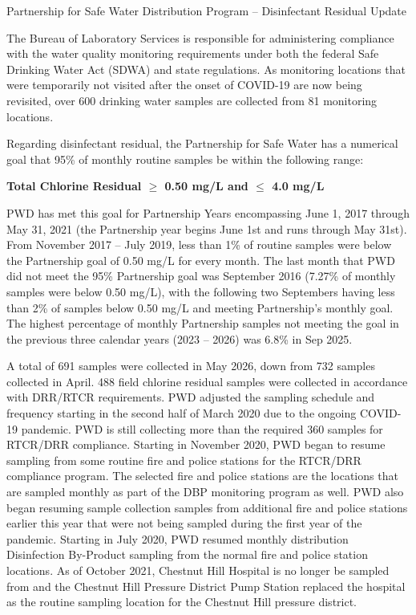 \documentclass[
]{article}
\author{}
\date{\vspace{-2.5em}}
\begin{document}
\renewcommand{\arraystretch}{2.5}

Partnership for Safe Water Distribution Program -- Disinfectant Residual
Update

The Bureau of Laboratory Services is responsible for administering
compliance with the water quality monitoring requirements under both the
federal Safe Drinking Water Act (SDWA) and state regulations. As
monitoring locations that were temporarily not visited after the onset
of COVID-19 are now being revisited, over 600 drinking water samples are
collected from 81 monitoring locations.

Regarding disinfectant residual, the Partnership for Safe Water has a
numerical goal that 95\% of monthly routine samples be within the
following range:

\textbf{Total Chlorine Residual \(\geq\) 0.50 mg/L and \(\leq\) 4.0
mg/L}

PWD has met this goal for Partnership Years encompassing June 1, 2017
through May 31, 2021 (the Partnership year begins June 1st and runs
through May 31st). From November 2017 -- July 2019, less than 1\% of
routine samples were below the Partnership goal of 0.50 mg/L for every
month. The last month that PWD did not meet the 95\% Partnership goal
was September 2016 (7.27\% of monthly samples were below 0.50 mg/L),
with the following two Septembers having less than 2\% of samples below
0.50 mg/L and meeting Partnership's monthly goal. The highest percentage
of monthly Partnership samples not meeting the goal in the previous
three calendar years (2023 -- 2026) was 6.8\% in Sep 2025.

A total of 691 samples were collected in May 2026, down from 732 samples
collected in April. 488 field chlorine residual samples were collected
in accordance with DRR/RTCR requirements. PWD adjusted the sampling
schedule and frequency starting in the second half of March 2020 due to
the ongoing COVID-19 pandemic. PWD is still collecting more than the
required 360 samples for RTCR/DRR compliance. Starting in November 2020,
PWD began to resume sampling from some routine fire and police stations
for the RTCR/DRR compliance program. The selected fire and police
stations are the locations that are sampled monthly as part of the DBP
monitoring program as well. PWD also began resuming sample collection
samples from additional fire and police stations earlier this year that
were not being sampled during the first year of the pandemic. Starting
in July 2020, PWD resumed monthly distribution Disinfection By-Product
sampling from the normal fire and police station locations. As of
October 2021, Chestnut Hill Hospital is no longer be sampled from and
the Chestnut Hill Pressure District Pump Station replaced the hospital
as the routine sampling location for the Chestnut Hill pressure
district.
\end{document}
